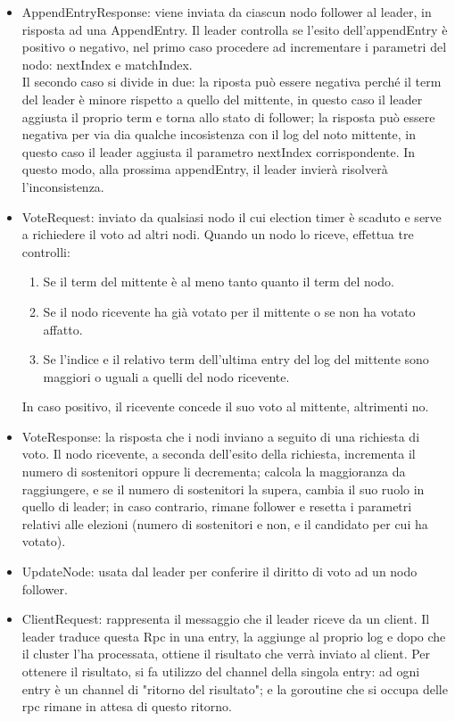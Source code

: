 \begin{itemize}
  \item AppendEntryResponse: viene inviata da ciascun nodo follower al leader, in risposta ad una AppendEntry. 
    Il leader controlla se l'esito dell'appendEntry è positivo o negativo, nel primo caso procedere ad incrementare i parametri del nodo:
    nextIndex e matchIndex. \\
    Il secondo caso si divide in due: la riposta può essere negativa perché il term del leader è minore rispetto a quello
    del mittente, in questo caso il leader aggiusta il proprio term e torna allo stato di follower; la risposta può
    essere negativa per via dia qualche incosistenza con il log del noto mittente, in questo caso il leader 
    aggiusta il parametro nextIndex corrispondente. In questo modo, alla prossima appendEntry, il leader invierà 
    risolverà l'inconsistenza.

  \item VoteRequest: inviato da qualsiasi nodo il cui election timer è scaduto e serve a richiedere il voto ad altri nodi. Quando 
    un nodo lo riceve, effettua tre controlli:
    \begin{enumerate}
      \item Se il term del mittente è al meno tanto quanto il term del nodo. 
      \item Se il nodo ricevente ha già votato per il mittente o se non ha votato affatto. 
      \item Se l'indice e il relativo term dell'ultima entry del log del mittente sono maggiori o uguali a quelli 
        del nodo ricevente.
    \end{enumerate}
    In caso positivo, il ricevente concede il suo voto al mittente, altrimenti no. 

  \item VoteResponse: la risposta che i nodi inviano a seguito di una richiesta di voto. Il nodo ricevente,
    a seconda dell'esito della richiesta, incrementa il numero di sostenitori oppure li decrementa; calcola
    la maggioranza da raggiungere, e se il numero di sostenitori la supera, cambia il suo ruolo in quello 
    di leader; in caso contrario, rimane follower e resetta i parametri relativi alle elezioni (numero di 
    sostenitori e non, e il candidato per cui ha votato).  

  \item UpdateNode: usata dal leader per conferire il diritto di voto ad un nodo follower. 

  \item ClientRequest: rappresenta il messaggio che il leader riceve da un client. Il leader traduce questa Rpc in 
    una entry, la aggiunge al proprio log e dopo che il cluster l'ha processata, ottiene il risultato che 
    verrà inviato al client. Per ottenere il risultato, si fa utilizzo del channel della singola entry: ad ogni entry è 
    un channel di "ritorno del risultato"; e la goroutine che si occupa delle rpc rimane in attesa di questo ritorno.


\end{itemize}
